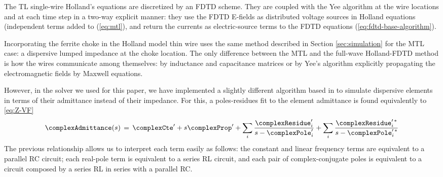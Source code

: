 The TL single-wire Holland's equations are discretized by an FDTD scheme. They are coupled with the Yee algorithm at the wire locations and at each time step in a two-way explicit manner: they use the FDTD E-fields as distributed voltage sources in Holland equations (independent terms added to (\ref{eq:mtl}), and return the currents as electric-source terms to the FDTD equations (\ref{eq:fdtd-base-algorithm}).

Incorporating the ferrite choke in the Holland model thin wire uses the same method described in Section \ref{sec:simulation} for the MTL case: a dispersive lumped impedance at the choke location. The only difference between the MTL and the full-wave Holland-FDTD method is how the wires communicate among themselves: by inductance and capacitance matrices or by Yee's algorithm explicitly propagating the electromagnetic fields by Maxwell equations. 

However, in the solver we used for this paper, we have implemented a slightly different algorithm based in \cite{Antonini2003} to simulate dispersive elements in terms of their admittance instead of their impedance. For this, a poles-residues fit to the element admittance is found equivalently to \autoref{eq:Z-VF} 
\begin{equation}\label{eq:Y-VF}
	\complexAdmittance(s)\,=\,\complexCte^{\prime} + s\complexProp^{\prime} + \sum_{i} \frac{\complexResidue^{\prime}_i}{s-\complexPole^{\prime}_i} + \sum_{i} \frac{\complexResidue_i^{\prime\,*}}{s-\complexPole_i^{\prime\,*}}
\end{equation}
%
The previous relationship allows us to interpret each term easily as follows: the constant and linear frequency terms are equivalent to a parallel RC circuit; each real-pole term is equivalent to a series RL circuit, and each pair of complex-conjugate poles is equivalent to a circuit composed by a series RL in series with a parallel RC.

